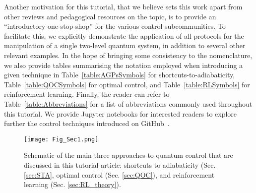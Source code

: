 Another motivation for this tutorial, that we believe sets this work apart from other reviews and pedagogical resources on the topic, is to provide an ``introductory one-stop-shop'' for the various control subcommunities. To facilitate this, we explicitly demonstrate the application of all protocols for the manipulation of a single two-level quantum system, in addition to several other relevant examples.  In the hope of bringing some consistency to the nomenclature, we also provide tables summarising the notation employed when introducing a given technique in Table~\ref{table:AGPsSymbols} for shortcuts-to-adiabaticity, Table~\ref{table:QOCSymbols} for optimal control, and Table~\ref{table:RLSymbols} for reinforcement learning. Finally, the reader can refer to Table~\ref{table:Abbreviations} for a list of abbreviations commonly used throughout this tutorial.
We provide Jupyter notebooks for interested readers to explore further the control techniques introduced on GitHub~\cite{github_code}.

\begin{figure}[t]
\texttt{[image: Fig\_Sec1.png]}
\label{fig:scope}
\caption{Schematic of the main three approaches to quantum control that are discussed in this tutorial article: shortcuts to adiabaticity (Sec. \ref{sec:STA}, optimal control (Sec. \ref{sec:QOC}), and reinforcement learning (Sec. \ref{sec:RL_theory}). }
\end{figure}

